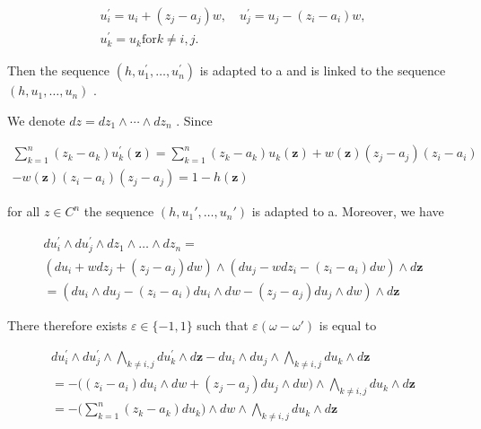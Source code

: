 \[
\begin{array}{c} u _ {i} ^ {\prime} = u _ {i} + (z _ {j} - a _ {j}) w, \quad u _ {j} ^ {\prime} = u _ {j} - (z _ {i} - a _ {i}) w, \\ u _ {k} ^ {\prime} = u _ {k} \text {for} k \neq i, j. \end{array}
\]

Then the sequence \((h,u_{1}^{\prime},\ldots,u_{n}^{\prime})\) is adapted to a and is linked to the sequence \((h,u_{1},\ldots,u_{n})\) .

We denote \(dz = dz_{1} \wedge \cdots \wedge dz_{n}\) . Since

\[
\begin{array}{c} \sum_ {k = 1} ^ {n} (z _ {k} - a _ {k}) u _ {k} ^ {\prime} (\boldsymbol {z}) = \sum_ {k = 1} ^ {n} (z _ {k} - a _ {k}) u _ {k} (\boldsymbol {z}) + w (\boldsymbol {z}) (z _ {j} - a _ {j}) (z _ {i} - a _ {i}) \\ - w (\boldsymbol {z}) (z _ {i} - a _ {i}) (z _ {j} - a _ {j}) = 1 - h (\boldsymbol {z}) \end{array}
\]

for all \(z \in C^{n}\) the sequence \((h, u_{1}', \ldots, u_{n}')\) is adapted to a. Moreover, we have

\[
\begin{array}{l} d u _ {i} ^ {\prime} \wedge d u _ {j} ^ {\prime} \wedge d z _ {1} \wedge \dots \wedge d z _ {n} = \\ \left(d u _ {i} + w d z _ {j} + (z _ {j} - a _ {j}) d w\right) \wedge \left(d u _ {j} - w d z _ {i} - (z _ {i} - a _ {i}) d w\right) \wedge d \boldsymbol {z} \\ = \left(d u _ {i} \wedge d u _ {j} - (z _ {i} - a _ {i}) d u _ {i} \wedge d w - (z _ {j} - a _ {j}) d u _ {j} \wedge d w\right) \wedge d \boldsymbol {z} \end{array}
\]

There therefore exists \(\varepsilon\in\{-1,1\}\) such that \(\varepsilon(\omega-\omega')\) is equal to

\[
\begin{array}{l} d u _ {i} ^ {\prime} \wedge d u _ {j} ^ {\prime} \wedge \bigwedge_ {k \neq i, j} d u _ {k} ^ {\prime} \wedge d \boldsymbol {z} - d u _ {i} \wedge d u _ {j} \wedge \bigwedge_ {k \neq i, j} d u _ {k} \wedge d \boldsymbol {z} \\ = - \Big ((z _ {i} - a _ {i}) d u _ {i} \wedge d w + (z _ {j} - a _ {j}) d u _ {j} \wedge d w \Big) \wedge \bigwedge_ {k \neq i, j} d u _ {k} \wedge d \boldsymbol {z} \\ = - \Big (\sum_ {k = 1} ^ {n} (z _ {k} - a _ {k})   d u _ {k} \Big) \wedge d w \wedge \bigwedge_ {k \neq i, j} d u _ {k} \wedge d \boldsymbol {z} \end{array}
\]

